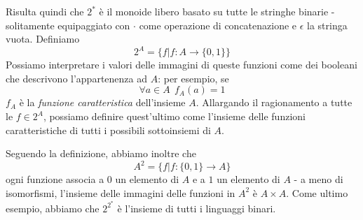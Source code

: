 Risulta quindi che $2^*$ è il monoide libero basato su tutte le stringhe binarie -
solitamente equipaggiato con $\cdot$ come operazione di concatenazione e $\epsilon$ la
stringa vuota. Definiamo
$$
	2^A = \{f | f: A \rightarrow \{0,1\}\}
$$
Possiamo interpretare i valori delle immagini di queste funzioni come dei booleani
che descrivono l'appartenenza ad $A$: per esempio, se
$$
	\forall a \in A ~~ f_A (a) = 1
$$
$f_A$ è la \textit{funzione caratteristica} dell'insieme $A$. Allargando il
ragionamento a tutte le $f \in 2^A$, possiamo definire quest'ultimo come l'insieme
delle funzioni caratteristiche di tutti i possibili sottoinsiemi di $A$.

Seguendo la definizione, abbiamo inoltre che
$$
	A^2 = \{f| f: \{0,1\} \rightarrow A\}
$$
ogni funzione associa a $0$ un elemento di $A$ e a $1$ un elemento di $A$ - a meno di isomorfismi,
l'insieme delle immagini delle funzioni in $A^2$ è $A \times A$.
Come ultimo esempio, abbiamo che $2^{2^*}$ è l'insieme di tutti i linguaggi
binari.
